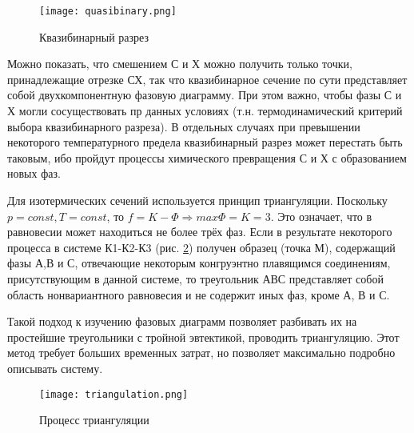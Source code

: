 \begin{figure}[h!]
\centering
\texttt{[image: quasibinary.png]}\caption{Квазибинарный разрез}\label{fig:quasibinary}
\end{figure}
\par Можно показать, что смешением С и Х можно получить только точки, принадлежащие отрезке СХ, так что квазибинарное сечение по сути представляет собой двухкомпонентную фазовую диаграмму. При этом важно, чтобы фазы С и Х могли сосуществовать пр данных условиях (т.н. термодинамический критерий выбора квазибинарного разреза). В отдельных случаях при превышении некоторого температурного предела квазибинарный разрез может перестать быть таковым, ибо пройдут процессы химического превращения С и Х с образованием новых фаз.
\par Для изотермических сечений используется принцип триангуляции. Поскольку $p=const, T=const$, то $f=K-\Phi \Rightarrow max\Phi=K=3$. Это означает, что в равновесии может находиться не более трёх фаз. Если в результате некоторого процесса в системе К1-К2-К3 (рис. \ref{fig:triangulation}) получен образец (точка М), содержащий фазы А,В и С, отвечающие некоторым конгруэнтно плавящимся соединениям, присутствующим в данной системе, то треугольник АВС представляет собой область нонвариантного равновесия и не содержит иных фаз, кроме А, В и С. 
\par Такой подход к изучению фазовых диаграмм позволяет разбивать их на простейшие треугольники с тройной эвтектикой, проводить триангуляцию. Этот метод требует больших временных затрат, но позволяет максимально подробно описывать систему.
\begin{figure}[h!]
\centering
\texttt{[image: triangulation.png]}\caption{Процесс триангуляции} \label{fig:triangulation}
\end{figure}
